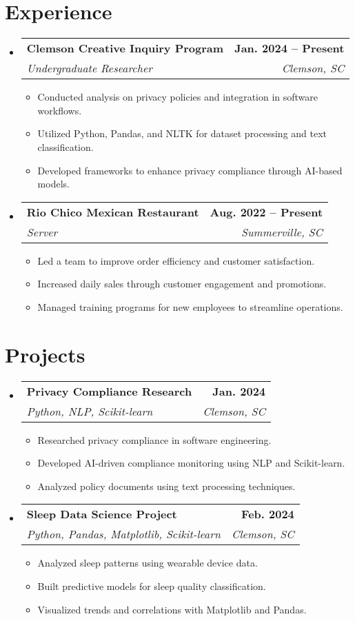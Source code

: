 \documentclass[letterpaper,11pt]{article}
\makeatletter
\newcommand{\resumeSubheading}[4]{
  \vspace{-2pt}\item[]
    \begin{tabular*}{1.0\textwidth}[t]{l@{\extracolsep{\fill}}r}
      \textbf{#1} & \textbf{\small #2} \\
      \textit{\small#3} & \textit{\small #4} \\
    \end{tabular*}\vspace{-7pt}
}
\makeatother
\begin{document}
\section{Experience}
\begin{itemize}
    \resumeSubheading{Clemson Creative Inquiry Program}{Jan. 2024 -- Present}{Undergraduate Researcher}{Clemson, SC}
    \begin{itemize}
        \item Conducted analysis on privacy policies and integration in software workflows.
        \item Utilized Python, Pandas, and NLTK for dataset processing and text classification.
        \item Developed frameworks to enhance privacy compliance through AI-based models.
    \end{itemize}

    \resumeSubheading{Rio Chico Mexican Restaurant}{Aug. 2022 -- Present}{Server}{Summerville, SC}
    \begin{itemize}
        \item Led a team to improve order efficiency and customer satisfaction.
        \item Increased daily sales through customer engagement and promotions.
        \item Managed training programs for new employees to streamline operations.
    \end{itemize}
\end{itemize}


\section{Projects}
\begin{itemize}
    \resumeSubheading{Privacy Compliance Research}{Jan. 2024}{Python, NLP, Scikit-learn}{Clemson, SC}
    \begin{itemize}
        \item Researched privacy compliance in software engineering.
        \item Developed AI-driven compliance monitoring using NLP and Scikit-learn.
        \item Analyzed policy documents using text processing techniques.
    \end{itemize}

    \resumeSubheading{Sleep Data Science Project}{Feb. 2024}{Python, Pandas, Matplotlib, Scikit-learn}{Clemson, SC}
    \begin{itemize}
        \item Analyzed sleep patterns using wearable device data.
        \item Built predictive models for sleep quality classification.
        \item Visualized trends and correlations with Matplotlib and Pandas.
    \end{itemize}
\end{itemize}
\end{document}
